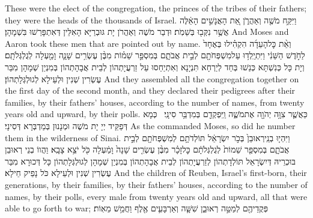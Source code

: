 {These were the elect of the congregation, the princes of the tribes of their fathers; they were the heads of the thousands of Israel.}{}
{וַיִּקַּ֥ח מֹשֶׁ֖ה וְאַהֲרֹ֑ן אֵ֚ת הָאֲנָשִׁ֣ים הָאֵ֔לֶּה אֲשֶׁ֥ר נִקְּב֖וּ בְּשֵׁמֹֽת׃}
{וּדְבַר מֹשֶׁה וְאַהֲרֹן יָת גּוּבְרַיָּא הָאִלֵּין דְּאִתְפָּרַשׁוּ בִּשְׁמָהָן׃}
{And Moses and Aaron took these men that are pointed out by name.}{}
{וְאֵ֨ת כׇּל\maqqaf הָעֵדָ֜ה הִקְהִ֗ילוּ בְּאֶחָד֙ לַחֹ֣דֶשׁ הַשֵּׁנִ֔י וַיִּתְיַֽלְד֥וּ עַל\maqqaf מִשְׁפְּחֹתָ֖ם לְבֵ֣ית אֲבֹתָ֑ם בְּמִסְפַּ֣ר שֵׁמ֗וֹת מִבֶּ֨ן עֶשְׂרִ֥ים שָׁנָ֛ה וָמַ֖עְלָה לְגֻלְגְּלֹתָֽם׃}
{וְיָת כָּל כְּנִשְׁתָּא כְּנַשׁוּ בְּחַד לְיַרְחָא תִּנְיָנָא וְאִתְיַחַסוּ עַל זַרְעֲיָתְהוֹן לְבֵית אֲבָהָתְהוֹן בְּמִנְיַן שְׁמָהָן מִבַּר עֶשְׂרִין שְׁנִין וּלְעֵילָא לְגוּלְגְּלָתְהוֹן׃}
{And they assembled all the congregation together on the first day of the second month, and they declared their pedigrees after their families, by their fathers’ houses, according to the number of names, from twenty years old and upward, by their polls.}{}
{כַּאֲשֶׁ֛ר צִוָּ֥ה יְהֹוָ֖ה אֶת\maqqaf מֹשֶׁ֑ה וַֽיִּפְקְדֵ֖ם בְּמִדְבַּ֥ר סִינָֽי׃ \setuma }
{כְּמָא דְּפַקֵּיד יְיָ יָת מֹשֶׁה וּמְנָנוּן בְּמַדְבְּרָא דְּסִינָי׃}
{As the \lord\space commanded Moses, so did he number them in the wilderness of Sinai.}{}
{וַיִּהְי֤וּ בְנֵֽי\maqqaf רְאוּבֵן֙ בְּכֹ֣ר יִשְׂרָאֵ֔ל תּוֹלְדֹתָ֥ם לְמִשְׁפְּחֹתָ֖ם לְבֵ֣ית אֲבֹתָ֑ם בְּמִסְפַּ֤ר שֵׁמוֹת֙ לְגֻלְגְּלֹתָ֔ם כׇּל\maqqaf זָכָ֗ר מִבֶּ֨ן עֶשְׂרִ֤ים שָׁנָה֙ וָמַ֔עְלָה כֹּ֖ל יֹצֵ֥א צָבָֽא׃}
{וַהֲווֹ בְנֵי רְאוּבֵן בּוּכְרֵיהּ דְּיִשְׂרָאֵל תּוֹלְדָתְהוֹן לְזַרְעֲיָתְהוֹן לְבֵית אֲבָהָתְהוֹן בְּמִנְיַן שְׁמָהָן לְגוּלְגְּלָתְהוֹן כָּל דְּכוּרָא מִבַּר עֶשְׂרִין שְׁנִין וּלְעֵילָא כֹּל נָפֵיק חֵילָא׃}
{And the children of Reuben, Israel’s first-born, their generations, by their families, by their fathers’ houses, according to the number of names, by their polls, every male from twenty years old and upward, all that were able to go forth to war;}{}
{פְּקֻדֵיהֶ֖ם לְמַטֵּ֣ה רְאוּבֵ֑ן שִׁשָּׁ֧ה וְאַרְבָּעִ֛ים אֶ֖לֶף וַחֲמֵ֥שׁ מֵאֽוֹת׃ \petucha }
